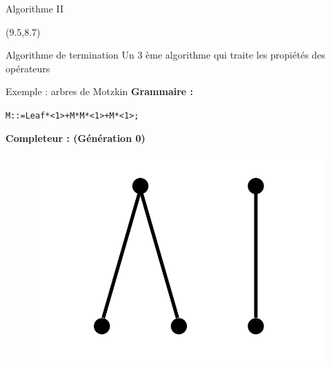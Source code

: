 \documentclass{beamer}
\begin{document}
\begin{frame}[fragile]{Algorithme II}

\begin{textblock}{5.5}(9.5,8.7)
\begin{block}{Algorithme de termination}
Un 3 ème algorithme qui traite les propiétés des opérateurs
\end{block}
\end{textblock}
\begin{algorithm}[H]
\end{algorithm}
\end{frame}

\begin{frame}{Exemple : arbres de Motzkin}
\textbf{Grammaire : } \\

\begin{alltt}
\hspace{10 mm} M ::= Leaf * <1> + M * M * <1> + M * <1>;
\end{alltt}
\textbf{Completeur : (Génération 0)} \\
\begin{figure}[h]
\centering
\includegraphics[scale=0.2]{const.png}
\end{figure}
\end{frame}
\end{document}
